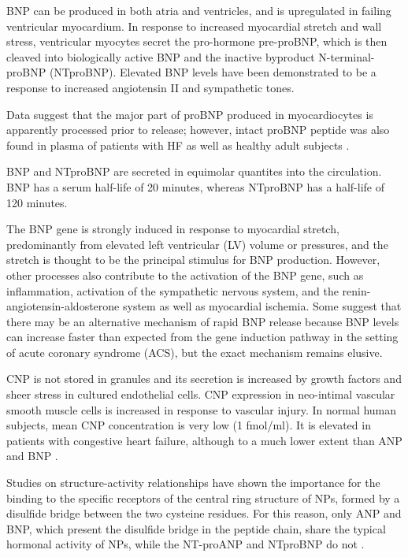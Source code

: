 \documentclass[14pt,a4paper,onecolumn]{extarticle}
\begin{document}

BNP can be produced in both atria and ventricles, and is upregulated in failing ventricular myocardium. In response to increased myocardial stretch and wall stress, ventricular myocytes secret the pro-hormone pre-proBNP, which is then cleaved into biologically active BNP and the inactive byproduct N-terminal-proBNP (NTproBNP). Elevated BNP levels have been demonstrated to be a response to increased angiotensin II and sympathetic tones. \citep{Iwanaga2006} %

Data suggest that the major part of proBNP produced in myocardiocytes is apparently processed prior to release; however, intact proBNP peptide was also found in plasma of patients with HF as well as healthy adult subjects \citep{14}. %

BNP and NTproBNP are secreted in equimolar quantites into the circulation.  BNP has a serum half-life of 20 minutes, whereas NTproBNP has a half-life of 120 minutes. \citep{DanielsandMaisel2007} %

The BNP gene is strongly induced in response to myocardial stretch, predominantly from elevated left ventricular (LV) volume or pressures, and the stretch is thought to be the principal stimulus for BNP production. However, other processes also contribute to the activation of the BNP gene, such as inflammation, activation of the sympathetic nervous system, and the renin-angiotensin-aldosterone system as well as myocardial ischemia. Some suggest that there may be an alternative mechanism of rapid BNP release because BNP levels can increase faster than expected from the gene induction pathway in the setting of acute coronary syndrome (ACS), but the exact mechanism remains elusive. \citep{Gaggin2014} %

CNP is not stored in granules and its secretion is increased by growth factors and sheer stress in cultured endothelial cells. CNP expression in neo-intimal vascular smooth muscle cells is increased in response to vascular injury. In normal human subjects, mean CNP concentration is very low (1 fmol/ml). It is elevated in patients with congestive heart failure, although to a much lower extent than ANP and BNP \citep{Charles2006} \citep{Del-Ry2005} \citep{Kalra2003}. %

Studies on structure-activity relationships have shown the importance for the binding to the specific receptors of the central ring structure of NPs, formed by a disulfide bridge between the two cysteine  residues. For this reason, only ANP and BNP, which present the disulfide bridge in the peptide chain, share the typical hormonal activity of NPs, while the NT-proANP and NTproBNP do not \citep{bib35} \citep{bib36} \citep{bib37}.
\end{document}
